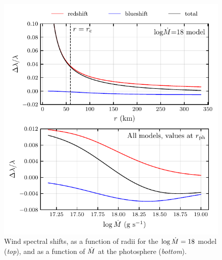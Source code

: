 \documentclass[../main.tex]{subfiles}
\begin{document}
\begin{figure}[H]
    \centering
    \includegraphics{figures/wind_lineshift.pdf}
    \caption[Wind spectral shifts]{Wind spectral shifts, as a function of radii for the $\log\dot{M}=18$ model (\textit{top}), and as a function of $\dot{M}$ at the photosphere (\textit{bottom}).}
    \label{fig:wind_spectral_shifts}
\end{figure}




\biblio
\end{document}
